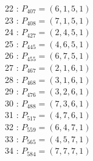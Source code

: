 \documentclass{article}
\begin{document}
{\begin{multicols}{2}
22 : $P_{407}=( 6, 1, 5, 1 )$\\
23 : $P_{408}=( 7, 1, 5, 1 )$\\
24 : $P_{427}=( 2, 4, 5, 1 )$\\
25 : $P_{445}=( 4, 6, 5, 1 )$\\
26 : $P_{455}=( 6, 7, 5, 1 )$\\
27 : $P_{467}=( 2, 1, 6, 1 )$\\
28 : $P_{468}=( 3, 1, 6, 1 )$\\
29 : $P_{476}=( 3, 2, 6, 1 )$\\
30 : $P_{488}=( 7, 3, 6, 1 )$\\
31 : $P_{517}=( 4, 7, 6, 1 )$\\
32 : $P_{559}=( 6, 4, 7, 1 )$\\
33 : $P_{565}=( 4, 5, 7, 1 )$\\
34 : $P_{584}=( 7, 7, 7, 1 )$\\
\end{multicols}
}
\end{document}
